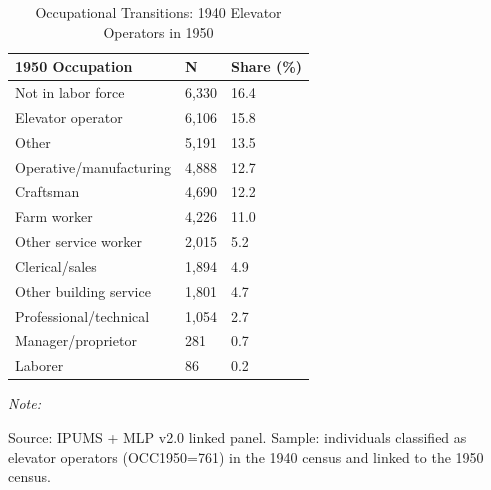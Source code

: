 \begin{table}[!h]
\centering
\caption{Occupational Transitions: 1940 Elevator Operators in 1950}
\label{tab:transition_matrix}
\centering
\begin{threeparttable}
\begin{tabular}[t]{lll}
\toprule
1950 Occupation & N & Share (\%)\\
\midrule
Not in labor force & 6,330 & 16.4\\
Elevator operator & 6,106 & 15.8\\
Other & 5,191 & 13.5\\
Operative/manufacturing & 4,888 & 12.7\\
Craftsman & 4,690 & 12.2\\
\addlinespace
Farm worker & 4,226 & 11.0\\
Other service worker & 2,015 & 5.2\\
Clerical/sales & 1,894 & 4.9\\
Other building service & 1,801 & 4.7\\
Professional/technical & 1,054 & 2.7\\
\addlinespace
Manager/proprietor & 281 & 0.7\\
Laborer & 86 & 0.2\\
\bottomrule
\end{tabular}
\begin{tablenotes}
\item \textit{Note: } 
\item Source: IPUMS + MLP v2.0 linked panel. Sample: individuals classified as elevator operators (OCC1950=761) in the 1940 census and linked to the 1950 census.
\end{tablenotes}
\end{threeparttable}
\end{table}
